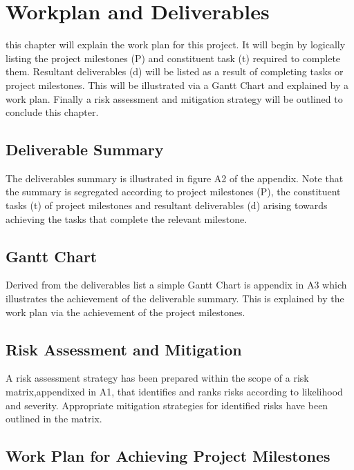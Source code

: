 %
%
\let\textcircled=\pgftextcircled
\chapter{Workplan and Deliverables}
\label{chap:Workplan and Deliverables}


this chapter will explain the work plan for this project. It will begin by logically listing the project milestones (P) and constituent task (t) required to complete them. Resultant deliverables (d) will be listed as a result of completing tasks or project milestones. This will be illustrated via a Gantt Chart and explained by a work plan. Finally a risk assessment and mitigation strategy will be outlined to conclude this chapter.

\section{Deliverable Summary}
The deliverables summary is illustrated in figure A2 of the appendix. Note that the summary is segregated according to project milestones (P), the constituent tasks (t) of project milestones and resultant deliverables (d) arising towards achieving the tasks that complete the relevant milestone.


\section{Gantt Chart}

Derived from the deliverables list a simple Gantt Chart is appendix in A3 which illustrates the achievement of the deliverable summary. This is explained by the work plan via the achievement of the project milestones.

\section{Risk Assessment and Mitigation}
A risk assessment strategy has been prepared within the scope of a risk matrix,appendixed in A1, that identifies and ranks risks according to likelihood and severity. Appropriate mitigation strategies for identified risks have been outlined in the matrix.

\newpage

\section{Work Plan for Achieving Project Milestones}


